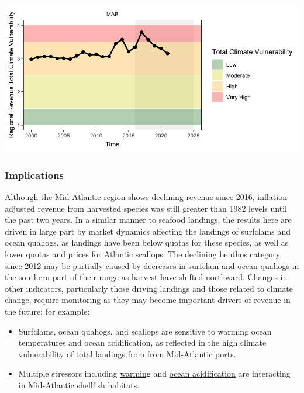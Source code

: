 \documentclass[
  10pt,
]{article}
\providecommand{\tightlist}{%
  \setlength{\itemsep}{0pt}\setlength{\parskip}{0pt}}
\let\origfigure\figure
\let\endorigfigure\endfigure
\renewenvironment{figure}[1][2] {
    \expandafter\origfigure\expandafter[H]
} {
    \endorigfigure
}
\begin{document}
\begin{figure}

{\centering \includegraphics{midatlantic_files/figure-latex/climatevul-rev-1} 

}

\caption{Mid-Atlantic region total climate vulnerability of commercial revenue (sum of Mid-Atlantic port revenue weighted by species climate vulnerability from Hare et al. 2016).}\label{fig:climatevul-rev}
\end{figure}

\subsubsection{Implications}\label{implications-1}

Although the Mid-Atlantic region shows declining revenue since 2016, inflation-adjusted revenue from harvested species was still greater than 1982 levels until the past two years. In a similar manner to seafood landings, the results here are driven in large part by market dynamics affecting the landings of surfclams and ocean quahogs, as landings have been below quotas for these species, as well as lower quotas and prices for Atlantic scallops. The declining benthos category since 2012 may be partially caused by decreases in surfclam and ocean quahogs in the southern part of their range as harvest have shifted northward. Changes in other indicators, particularly those driving landings and those related to climate change, require monitoring as they may become important drivers of revenue in the future; for example:

\begin{itemize}
\tightlist
\item
  Surfclams, ocean quahogs, and scallops are sensitive to warming ocean temperatures and ocean acidification, as reflected in the high climate vulnerability of total landings from from Mid-Atlantic ports.
\item
  Multiple stressors including \href{https://noaa-edab.github.io/catalog/bottom_temp_insitu.html}{warming} and \href{https://noaa-edab.github.io/catalog/ocean_acidification}{ocean acidification} are interacting in Mid-Atlantic shellfish habitats.
\end{itemize}
\end{document}
